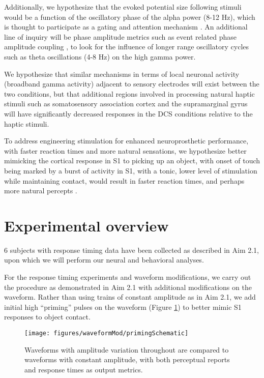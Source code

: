 Additionally, we hypothesize that the evoked potential size following stimuli would be a function of the oscillatory phase of the alpha power (8-12 Hz), which is thought to participate as a gating and attention mechanism \cite{Ai2014}. An additional line of inquiry will be phase amplitude metrics such as event related phase amplitude coupling \cite{Voytek2013}, to look for the influence of longer range oscillatory cycles such as theta oscillations (4-8 Hz) on the high gamma power. 

We hypothesize that similar mechanisms in terms of local neuronal activity (broadband gamma activity) adjacent to sensory electrodes will exist between the two conditions, but that additional regions involved in processing natural haptic stimuli such as somatosensory association cortex and the supramarginal gyrus will have significantly decreased responses in the DCS conditions relative to the haptic stimuli. 

To address engineering stimulation for enhanced neuroprosthetic performance, with faster reaction times and more natural sensations, we hypothesize better mimicking the cortical response in S1 to picking up an object, with onset of touch being marked by a burst of activity in S1, with a tonic, lower level of stimulation while maintaining contact, would result in faster reaction times, and perhaps more natural percepts \cite{Tabot2013,Bensmaia2015}.

\section{Experimental overview}
6 subjects with response timing data have been collected as described in Aim 2.1, upon which we will perform our neural and behavioral analyses. 

For the response timing experiments and waveform modifications, we carry out the procedure as demonstrated in Aim 2.1 with additional modifications on the waveform. Rather than using trains of constant amplitude as in Aim 2.1, we add initial high “priming” pulses on the waveform (Figure \ref{fig:waveformModOverview}) to better mimic S1 responses to object contact. 

\begin{figure}[ht]
	\centering
	\texttt{[image: figures/waveformMod/primingSchematic]}
	\caption[Experimental overview of modifications to waveforms to test reaction times]{Waveforms with amplitude variation throughout are compared to waveforms with constant amplitude, with both perceptual reports and response times as output metrics.}
	\label{fig:waveformModOverview}
\end{figure}

